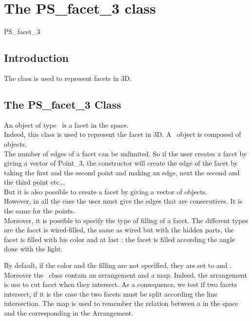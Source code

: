 \chapter{The PS\_facet\_3 class}

\begin{ccClass} {PS_facet_3}

\section{Introduction}

The class  is used to represent facets in 3D.

\section{The PS\_facet\_3 Class}

\ccDefinition 

An object of type \ccClassName\ is a facet in the space.\\
Indeed, this class is used to represent the facet in 3D.
A  \ccClassName\ object is composed of  objects. \\
The number of edges of a facet can be unlimited. So if the user creates a
facet by giving a vector of Point\_3, the constructor will create the edge of the facet by taking
the first and the second point and making an edge, next the second and 
the third point etc...\\
But it is also possible to create a facet by giving a vector of 
objects. \\
However, in all the case the user must give the edges that are
consecutives. It is the same for the points.\\ 
Moreover, it is possible to specify the type of filling of a facet.
The different types are  the facet is wired-filled,
 the same as wired but with the hidden
parts,  the facet is filled with his color and at last
 : the facet is filled according the angle done with the light.

By default, if the color and the filling are not specified, they are
set to  and .
Moreover the  \ccClassName\ class contain an arrangement and a
map. Indeed, the arrangement is use to cut facet when they intersect.
As a consequence, we test if two facets intersect, if it is the case
the two facets must be split according the line intersection.
The map is used to remember the relation between a   in the space 
and the   corresponding in the Arrangement.


\end{ccClass}
